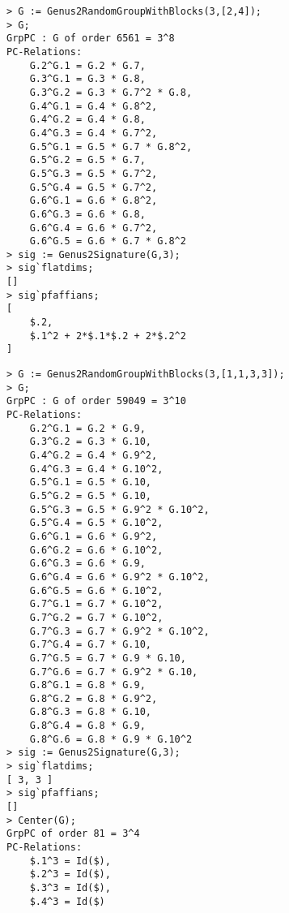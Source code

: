 \documentclass{amsart}
\begin{document}
\begin{lstlisting}[frame=single,basicstyle=\ttfamily\color{black!30!teal},backgroundcolor=\color{white!70!gray}]
> G := Genus2RandomGroupWithBlocks(3,[2,4]);  
> G;
GrpPC : G of order 6561 = 3^8
PC-Relations:
    G.2^G.1 = G.2 * G.7, 
    G.3^G.1 = G.3 * G.8, 
    G.3^G.2 = G.3 * G.7^2 * G.8, 
    G.4^G.1 = G.4 * G.8^2, 
    G.4^G.2 = G.4 * G.8, 
    G.4^G.3 = G.4 * G.7^2, 
    G.5^G.1 = G.5 * G.7 * G.8^2, 
    G.5^G.2 = G.5 * G.7, 
    G.5^G.3 = G.5 * G.7^2, 
    G.5^G.4 = G.5 * G.7^2, 
    G.6^G.1 = G.6 * G.8^2, 
    G.6^G.3 = G.6 * G.8, 
    G.6^G.4 = G.6 * G.7^2, 
    G.6^G.5 = G.6 * G.7 * G.8^2
> sig := Genus2Signature(G,3);
> sig`flatdims;
[]
> sig`pfaffians;
[
    $.2,
    $.1^2 + 2*$.1*$.2 + 2*$.2^2
]
\end{lstlisting}

\begin{lstlisting}[frame=single,basicstyle=\ttfamily\color{black!30!teal},backgroundcolor=\color{white!70!gray}]
> G := Genus2RandomGroupWithBlocks(3,[1,1,3,3]);
> G;
GrpPC : G of order 59049 = 3^10
PC-Relations:
    G.2^G.1 = G.2 * G.9, 
    G.3^G.2 = G.3 * G.10, 
    G.4^G.2 = G.4 * G.9^2, 
    G.4^G.3 = G.4 * G.10^2, 
    G.5^G.1 = G.5 * G.10, 
    G.5^G.2 = G.5 * G.10, 
    G.5^G.3 = G.5 * G.9^2 * G.10^2, 
    G.5^G.4 = G.5 * G.10^2, 
    G.6^G.1 = G.6 * G.9^2, 
    G.6^G.2 = G.6 * G.10^2, 
    G.6^G.3 = G.6 * G.9, 
    G.6^G.4 = G.6 * G.9^2 * G.10^2, 
    G.6^G.5 = G.6 * G.10^2, 
    G.7^G.1 = G.7 * G.10^2, 
    G.7^G.2 = G.7 * G.10^2, 
    G.7^G.3 = G.7 * G.9^2 * G.10^2, 
    G.7^G.4 = G.7 * G.10, 
    G.7^G.5 = G.7 * G.9 * G.10, 
    G.7^G.6 = G.7 * G.9^2 * G.10, 
    G.8^G.1 = G.8 * G.9, 
    G.8^G.2 = G.8 * G.9^2, 
    G.8^G.3 = G.8 * G.10, 
    G.8^G.4 = G.8 * G.9, 
    G.8^G.6 = G.8 * G.9 * G.10^2
> sig := Genus2Signature(G,3);
> sig`flatdims;
[ 3, 3 ]
> sig`pfaffians;
[]
> Center(G);
GrpPC of order 81 = 3^4
PC-Relations:
    $.1^3 = Id($), 
    $.2^3 = Id($), 
    $.3^3 = Id($), 
    $.4^3 = Id($)
\end{lstlisting}

\begin{bibdiv}
\begin{biblist}



\end{biblist}
\end{bibdiv}
\end{document}
